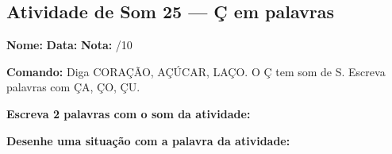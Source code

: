 \subsection{Atividade de Som 25 --- Ç em palavras}
\begin{exercicio}



\noindent\textbf{Nome:} \underline{\hspace{3.2cm}} \quad \textbf{Data:} \underline{\hspace{1.6cm}} \quad \textbf{Nota:} \underline{\hspace{0.9cm}}/10


\noindent\textbf{Comando:} Diga CORAÇÃO, AÇÚCAR, LAÇO. O Ç tem som de S. Escreva palavras com ÇA, ÇO, ÇU.


\begin{center}
\end{center}

\noindent\textbf{Escreva 2 palavras com o som da atividade:}

\begin{center}
  \underline{\hspace{3cm}} \quad \underline{\hspace{3cm}}
\end{center}

\noindent\textbf{Desenhe uma situação com a palavra da atividade:}

\begin{center}
\end{center}

\end{exercicio}



